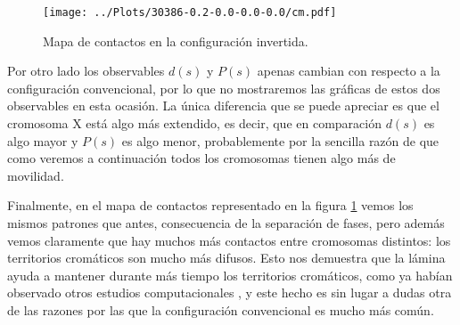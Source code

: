 \begin{figure}[t]
    \centering
    \texttt{[image: ../Plots/30386-0.2-0.0-0.0-0.0/cm.pdf]}
    \caption{Mapa de contactos en la configuración invertida.}
    \label{fig:cm_i}
\end{figure}

Por otro lado los observables $d(s)$ y $P(s)$ apenas cambian con respecto a la configuración convencional, por lo que no mostraremos las gráficas de estos dos observables en esta ocasión. La única diferencia que se puede apreciar es que el cromosoma X está algo más extendido, es decir, que en comparación $d(s)$ es algo mayor y $P(s)$ es algo menor, probablemente por la sencilla razón de que como veremos a continuación todos los cromosomas tienen algo más de movilidad.

Finalmente, en el mapa de contactos representado en la figura \ref{fig:cm_i} vemos los mismos patrones que antes, consecuencia de la separación de fases, pero además vemos claramente que hay muchos más contactos entre cromosomas distintos: los territorios cromáticos son mucho más difusos. Esto nos demuestra que la lámina ayuda a mantener durante más tiempo los territorios cromáticos, como ya habían observado otros estudios computacionales \cite{Kinney2018}, y este hecho es sin lugar a dudas otra de las razones por las que la configuración convencional es mucho más común.
